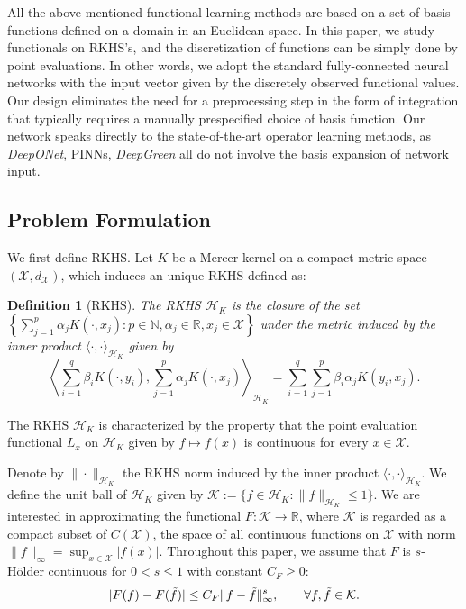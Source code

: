 \documentclass{article}
\def\NN{\mathbb N}
\def\RR{\mathbb R}
\numberwithin{equation}{section}
\newtheorem{definition}[theorem]{Definition}
\begin{document}
All the above-mentioned functional learning methods are based on a set of basis functions defined on a domain in an Euclidean space. 
In this paper, we study functionals on RKHS's, and the discretization of functions can be simply done by point evaluations.
In other words, we adopt the standard fully-connected neural networks with the input vector given by the discretely observed functional values. 
Our design eliminates the need for a preprocessing step in the form of integration that typically requires a manually prespecified choice of basis function. 
Our network speaks directly to the state-of-the-art operator learning methods, as \textit{DeepONet}, PINNs, \textit{DeepGreen} all do not involve the basis expansion of network input. 

\subsection{Problem Formulation}
We first define RKHS. Let $K$ be a  Mercer kernel on a compact metric space $(\mathcal{X}, d_\mathcal{X})$, which induces an unique RKHS \citep{aronszajn1950theory} defined as:
\begin{definition}[RKHS]
The RKHS $\mathcal{H}_K$ is the closure of the set $\left\{\sum_{j=1}^p \alpha_j K(\cdot, x_j): p\in \NN, \alpha_j \in \RR, x_j \in \mathcal{X}\right\}$ under the metric induced by the inner product $ \langle \cdot, \cdot \rangle_{\mathcal{H}_K}$ 
 given by $$\left\langle \sum_{i=1}^q \beta_i K(\cdot, y_i), \sum_{j=1}^p \alpha_j K(\cdot, x_j) \right\rangle_{\mathcal{H}_K}  = \sum_{i=1}^q \sum_{j=1}^p \beta_i \alpha_j K(y_i, x_j).$$
\end{definition}
The RKHS  $\mathcal{H}_K$ is characterized by the property that the point evaluation functional $L_x$ on $\mathcal{H}_K$ given by $f \mapsto f(x)$ is continuous for every $ x \in \mathcal{X}$.

Denote by $\|\cdot\|_{\mathcal{H}_K}$ the RKHS norm induced by the inner product $ \langle \cdot, \cdot \rangle_{\mathcal{H}_K}$. 
We define the unit ball of $\mathcal{H}_K$ given by 
$
    \mathcal{K} := \{f\in \mathcal{H}_K: \|f\|_{\mathcal{H}_K} \leq 1\}.
$
We are interested in  approximating the functional $F:\mathcal{K} \rightarrow \RR$, where $\mathcal{K}$ is regarded as a compact subset of $C(\mathcal{X})$, the space of all continuous functions on $\mathcal{X}$ with norm $\|f\|_\infty = \sup_{x\in \mathcal{X}}|f(x)|$. Throughout this paper, we assume that $F$ is $s$-H\"{o}lder continuous for $0<s \leq 1$ with constant $C_F \geq 0$:
\begin{equation}
    |F(f) - F(\Tilde{f})| \leq C_F \|f-\Tilde{f}\|^s_\infty, \qquad \forall f, \Tilde{f} \in \mathcal{K}.
\end{equation}
\end{document}
